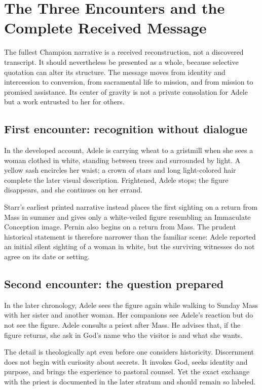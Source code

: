 \section{The Three Encounters and the Complete Received Message}

The fullest Champion narrative is a received reconstruction, not a discovered transcript. It should nevertheless be presented as a whole, because selective quotation can alter its structure. The message moves from identity and intercession to conversion, from sacramental life to mission, and from mission to promised assistance. Its center of gravity is not a private consolation for Adele but a work entrusted to her for others.

\subsection{First encounter: recognition without dialogue}

In the developed account, Adele is carrying wheat to a gristmill when she sees a woman clothed in white, standing between trees and surrounded by light. A yellow sash encircles her waist; a crown of stars and long light-colored hair complete the later visual description. Frightened, Adele stops; the figure disappears, and she continues on her errand.

Starr's earliest printed narrative instead places the first sighting on a return from Mass in summer and gives only a white-veiled figure resembling an Immaculate Conception image. Pernin also begins on a return from Mass. The prudent historical statement is therefore narrower than the familiar scene: Adele reported an initial silent sighting of a woman in white, but the surviving witnesses do not agree on its date or setting.

\subsection{Second encounter: the question prepared}

In the later chronology, Adele sees the figure again while walking to Sunday Mass with her sister and another woman. Her companions see Adele's reaction but do not see the figure. Adele consults a priest after Mass. He advises that, if the figure returns, she ask in God's name who the visitor is and what she wants.

The detail is theologically apt even before one considers historicity. Discernment does not begin with curiosity about secrets. It invokes God, seeks identity and purpose, and brings the experience to pastoral counsel. Yet the exact exchange with the priest is documented in the later stratum and should remain so labeled.

